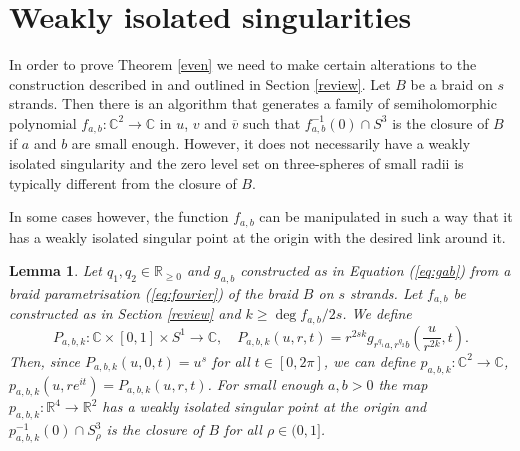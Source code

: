 \documentclass[notitlepage,12pt]{revtex4-1}
\newtheorem{lemma}[theorem]{\bf Lemma}
\begin{document}
\section{Weakly isolated singularities}
\label{weak}

In order to prove Theorem \ref{even} we need to make certain alterations to the construction described in \cite{bode:2016polynomial} and outlined in Section \ref{review}. Let $B$ be a braid on $s$ strands. Then there is an algorithm that generates a family of semiholomorphic polynomial $f_{a,b}:\mathbb{C}^{2}\to\mathbb{C}$ in $u$, $v$ and $\overline{v}$ such that $f_{a,b}^{-1}(0)\cap S^{3}$ is the closure of $B$ if $a$ and $b$ are small enough. However, it does not necessarily have a weakly isolated singularity and the zero level set on three-spheres of small radii is typically different from the closure of $B$.

In some cases however, the function $f_{a,b}$ can be manipulated in such a way that it has a weakly isolated singular point at the origin with the desired link around it.

\begin{lemma}
\label{general}
Let $q_{1},q_{2}\in\mathbb{R}_{\geq 0}$ and $g_{a,b}$ constructed as in Equation (\ref{eq:gab}) from a braid parametrisation (\ref{eq:fourier}) of the braid $B$ on $s$ strands. Let $f_{a,b}$ be constructed as in Section \ref{review} and $k\geq \deg f_{a,b}/2s$.
We define 
\begin{equation}
\label{eq:firstscaling}
P_{a,b,k}:\mathbb{C}\times[0,1]\times S^1\to\mathbb{C},\quad P_{a,b,k}(u,r,t)=r^{2sk} g_{r^{q_{1}} a,r^{q_{2}} b}\left(\frac{u}{r^{2k}},t\right).
\end{equation}
Then, since $P_{a,b,k}(u,0,t)=u^s$ for all $t\in[0,2\pi]$, we can define $p_{a,b,k}:\mathbb{C}^2\to\mathbb{C}$, $p_{a,b,k}(u,re^{it})=P_{a,b,k}(u,r,t)$. For small enough $a,b>0$ the map $p_{a,b,k}:\mathbb{R}^4\to\mathbb{R}^2$ has a weakly isolated singular point at the origin and $p_{a,b,k}^{-1}(0)\cap S^{3}_{\rho}$ is the closure of $B$ for all $\rho\in(0,1]$.
\end{lemma}
\end{document}
